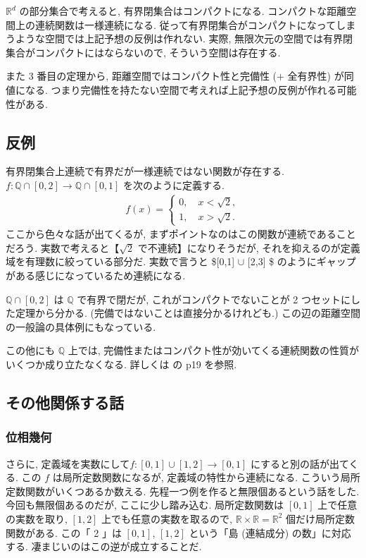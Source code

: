 \documentclass[openany, a4paper, oneside]{jsbook}
\begin{document}
$\mathbb{R}^d$ の部分集合で考えると, 有界閉集合はコンパクトになる.
コンパクトな距離空間上の連続関数は一様連続になる.
従って有界閉集合がコンパクトになってしまうような空間では上記予想の反例は作れない.
実際, 無限次元の空間では有界閉集合がコンパクトにはならないので, そういう空間は存在する.

また 3 番目の定理から, 距離空間ではコンパクト性と完備性 ($+$ 全有界性) が同値になる.
つまり完備性を持たない空間で考えれば上記予想の反例が作れる可能性がある.
\subsection{反例}

有界閉集合上連続で有界だが一様連続ではない関数が存在する.
$f \colon \mathbb{Q} \cap [0, 2] \to \mathbb{Q} \cap [0, 1]$ を次のように定義する.
\begin{align}
 f (x)
 =
 \begin{cases}
  0, \quad x < \sqrt{2}, \\
  1, \quad x > \sqrt{2}.
 \end{cases}
\end{align}
ここから色々な話が出てくるが, まずポイントなのはこの関数が連続であることだろう.
実数で考えると【$\sqrt{2}$ で不連続】になりそうだが, それを抑えるのが定義域を有理数に絞っている部分だ.
実数で言うと \$[0,1] $\cup$ [2,3] \$ のようにギャップがある感じになっているため連続になる.

$\mathbb{Q} \cap[0, 2]$ は $\mathbb{Q}$ で有界で閉だが,
これがコンパクトでないことが 2 つセットにした定理から分かる.
(完備ではないことは直接分かるけれども.)
この辺の距離空間の一般論の具体例にもなっている.

この他にも $\mathbb{Q}$ 上では, 完備性またはコンパクト性が効いてくる連続関数の性質がいくつか成り立たなくなる.
詳しくは \cite{GelbaumOlmsted1} の p19 を参照.
\subsection{その他関係する話}

\subsubsection{位相幾何}

さらに, 定義域を実数にして$f \colon [0,1] \cup [1,2] \to [0,1]$ にすると別の話が出てくる.
この $f$ は局所定数関数になるが, 定義域の特性から連続になる.
こういう局所定数関数がいくつあるか数える.
先程一つ例を作ると無限個あるという話をした.
今回も無限個あるのだが, ここに少し踏み込む.
局所定数関数は $[0,1]$ 上で任意の実数を取り, $[1,2]$ 上でも任意の実数を取るので,
$\mathbb{R} \times \mathbb{R} = \mathbb{R}^2$ 個だけ局所定数関数がある.
この「 2 」は $[0,1]$, $[1,2]$ という「島 (連結成分) の数」に対応する.
凄まじいのはこの逆が成立することだ.
\end{document}
